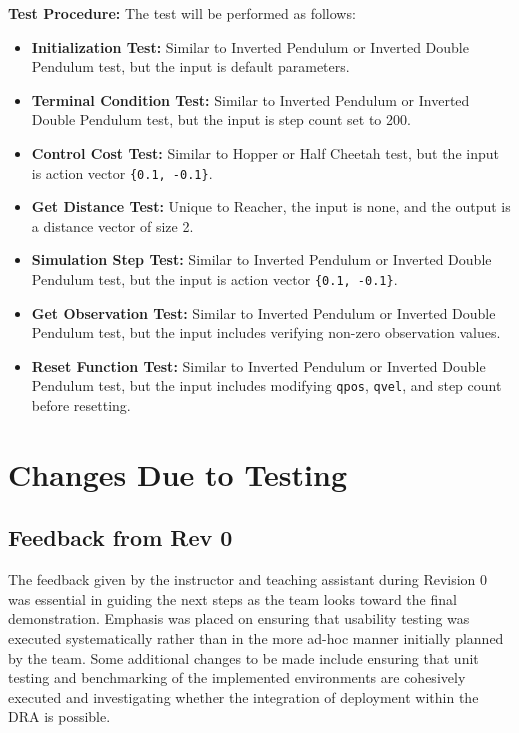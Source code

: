 \documentclass[12pt, titlepage]{article}
\begin{document}
\textbf{Test Procedure:} The test will be performed as follows:
\begin{itemize}
    \item \textbf{Initialization Test:} Similar to Inverted Pendulum or Inverted Double Pendulum test, but the input is default parameters.
    
    \item \textbf{Terminal Condition Test:} Similar to Inverted Pendulum or Inverted Double Pendulum test, but the input is step count set to 200.
    
    \item \textbf{Control Cost Test:} Similar to Hopper or Half Cheetah test, but the input is action vector \texttt{\{0.1, -0.1\}}.
    
    \item \textbf{Get Distance Test:} Unique to Reacher, the input is none, and the output is a distance vector of size 2.
    
    \item \textbf{Simulation Step Test:} Similar to Inverted Pendulum or Inverted Double Pendulum test, but the input is action vector \texttt{\{0.1, -0.1\}}.
    
    \item \textbf{Get Observation Test:} Similar to Inverted Pendulum or Inverted Double Pendulum test, but the input includes verifying non-zero observation values.
    
    \item \textbf{Reset Function Test:} Similar to Inverted Pendulum or Inverted Double Pendulum test, but the input includes modifying \texttt{qpos}, \texttt{qvel}, and step count before resetting.
\end{itemize}


\section{Changes Due to Testing}

\subsection{Feedback from Rev 0}
The feedback given by the instructor and teaching assistant during Revision 0 was essential in guiding the next steps as the team looks toward the final demonstration.
Emphasis was placed on ensuring that usability testing was executed systematically rather than in the more ad-hoc manner initially planned by the team.
Some additional changes to be made include ensuring that unit testing and benchmarking of the implemented environments are cohesively executed and investigating whether the integration of deployment within the DRA is possible.
\end{document}
